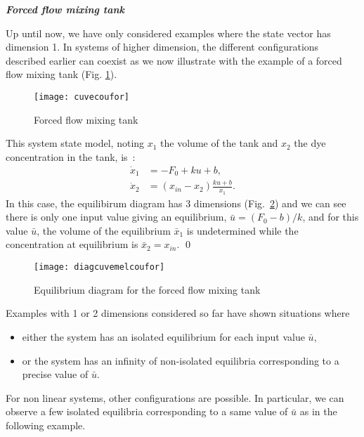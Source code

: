 \begin{exemple}{\bf{\em Forced flow mixing tank}}

Up until now, we have only considered examples where the state vector has dimension 1. 
In systems of higher dimension, the different configurations described earlier can coexist
as we now illustrate with the example of a forced flow mixing tank (Fig. \ref{fig:cuvecoufor}).
\begin{figure}[ht]
\begin{center}
\texttt{[image: cuvecoufor]}
\caption{Forced flow mixing tank}
\label{fig:cuvecoufor}
\end{center} 
\end{figure}
This system state model, noting $x_1$ the volume of the tank and $x_2$
the dye concentration in the tank, is~:
\begin{equation*} \begin{split}
\dot x_1&= -F_0+k u+b,\\
\dot x_2&=(x_{in}-x_2)\frac{k u+b}{x_1}.
\end{split} \end{equation*}
In this case, the equilibirum diagram has 3 dimensions (Fig.~\ref{fig:diagcuvemelcoufor}) 
and we can see there is only one input value giving an equilibrium, $\bar u=(F_0-b)/k$, 
and for this value $\bar u$, the volume of the equilibrium $\bar x_1$ is 
undetermined while the concentration at equilibrium is $\bar x_2=x_{in}$. \qed
\begin{figure}[h]
\begin{center}
\texttt{[image: diagcuvemelcoufor]}
\caption{Equilibrium diagram for the forced flow mixing tank}
\label{fig:diagcuvemelcoufor}
\end{center} 
\end{figure}
\end{exemple}

Examples with 1 or 2 dimensions considered so far have shown situations where
\begin{itemize}
\item either the system has an isolated equilibrium for 
each input value $\bar u$,
\item or the system has an infinity of non-isolated equilibria
corresponding to a precise value of $\bar u$.
\end{itemize}
For non linear systems, other configurations are possible. In particular,
we can observe a few isolated equilibria corresponding to a same value of 
$\bar u$ as in the following example.

